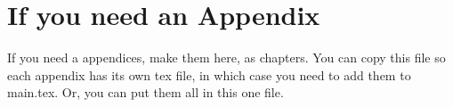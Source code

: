\chapter{If you need an Appendix}

If you need a appendices, make them here, as chapters. You can copy this file so each appendix has its own tex file, in which case you need to add them to main.tex. Or, you can put them all in this one file. 
